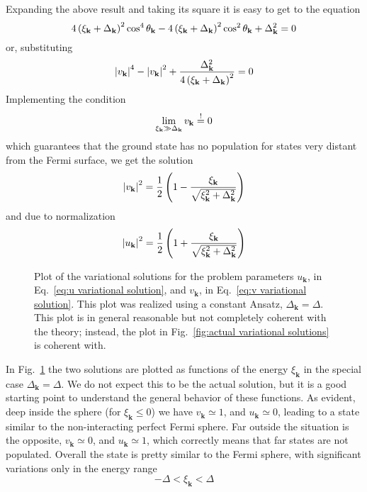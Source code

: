 Expanding the above result and taking its square it is easy to get to the equation
\[
	4 \left({\xi_\mathbf{k} + \Delta_\mathbf{k}}\right)^2 \cos^4\theta_\mathbf{k} - 4 \left({\xi_\mathbf{k} + \Delta_\mathbf{k}}\right)^2 \cos^2\theta_\mathbf{k} + \Delta_\mathbf{k}^2 = 0
\]
or, substituting
\[
	\abs{v_\mathbf{k}}^4 - \abs{v_\mathbf{k}}^2 + \frac{\Delta_\mathbf{k}^2}{4 \left({\xi_\mathbf{k} + \Delta_\mathbf{k}}\right)^2} = 0
\]
Implementing the condition
\[
	\lim_{\xi_\mathbf{k} \gg \Delta_\mathbf{k}} v_\mathbf{k} \stackrel{!}{=} 0
\]
which guarantees that the ground state has no population for states very distant from the Fermi surface, we get the solution
\begin{equation}\label{eq:v variational solution}
	\abs{v_\mathbf{k}}^2 = \frac{1}{2} \left({1 - \frac{\xi_\mathbf{k}}{\sqrt{\xi_\mathbf{k}^2 + \Delta_\mathbf{k}^2}}}\right) 
\end{equation}
and due to normalization
\begin{equation}\label{eq:u variational solution}
	\abs{u_\mathbf{k}}^2 = \frac{1}{2} \left({1 + \frac{\xi_\mathbf{k}}{\sqrt{\xi_\mathbf{k}^2 + \Delta_\mathbf{k}^2}}}\right) 
\end{equation}

\begin{figure}
	\centering
	
	\caption{Plot of the variational solutions for the problem parameters $u_\mathbf{k}$, in Eq.~\eqref{eq:u variational solution}, and $v_\mathbf{k}$, in Eq.~\eqref{eq:v variational solution}. This plot was realized using a constant Ansatz, $\Delta_\mathbf{k} = \Delta$. This plot is in general reasonable but not completely coherent with the theory; instead, the plot in Fig.~\ref{fig:actual variational solutions} is coherent with.}
	\label{fig:variational solutions}
\end{figure}

In Fig.~\ref{fig:variational solutions} the two solutions are plotted as functions of the energy $\xi_\mathbf{k}$ in the special case $\Delta_\mathbf{k} = \Delta$. We do not expect this to be the actual solution, but it is a good starting point to understand the general behavior of these functions. As evident, deep inside the sphere (for $\xi_\mathbf{k}\le0$) we have $v_\mathbf{k} \simeq 1$, and $u_\mathbf{k} \simeq 0$, leading to a state similar to the non-interacting perfect Fermi sphere. Far outside the situation is the opposite, $v_\mathbf{k} \simeq 0$, and $u_\mathbf{k} \simeq 1$, which correctly means that far states are not populated. Overall the state is pretty similar to the Fermi sphere, with significant variations only in the energy range
\[
	- \Delta < \xi_\mathbf{k} < \Delta
\]

